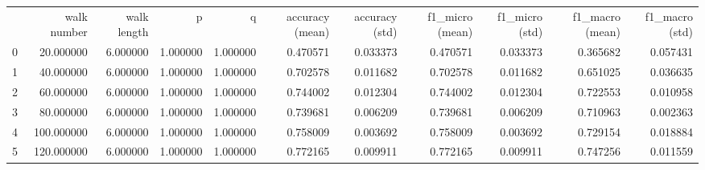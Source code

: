 \begin{tabular}{lrrrrrrrrrr}
 & walk number & walk length & p & q & accuracy (mean) & accuracy (std) & f1_micro (mean) & f1_micro (std) & f1_macro (mean) & f1_macro (std) \\
0 & 20.000000 & 6.000000 & 1.000000 & 1.000000 & 0.470571 & 0.033373 & 0.470571 & 0.033373 & 0.365682 & 0.057431 \\
1 & 40.000000 & 6.000000 & 1.000000 & 1.000000 & 0.702578 & 0.011682 & 0.702578 & 0.011682 & 0.651025 & 0.036635 \\
2 & 60.000000 & 6.000000 & 1.000000 & 1.000000 & 0.744002 & 0.012304 & 0.744002 & 0.012304 & 0.722553 & 0.010958 \\
3 & 80.000000 & 6.000000 & 1.000000 & 1.000000 & 0.739681 & 0.006209 & 0.739681 & 0.006209 & 0.710963 & 0.002363 \\
4 & 100.000000 & 6.000000 & 1.000000 & 1.000000 & 0.758009 & 0.003692 & 0.758009 & 0.003692 & 0.729154 & 0.018884 \\
5 & 120.000000 & 6.000000 & 1.000000 & 1.000000 & 0.772165 & 0.009911 & 0.772165 & 0.009911 & 0.747256 & 0.011559 \\
\end{tabular}

